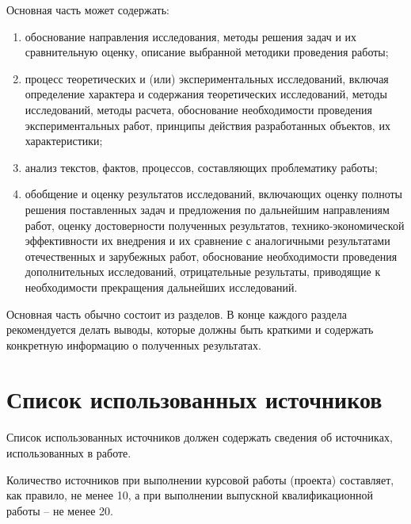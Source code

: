 \documentclass[14pt]{extreport}
\begin{document}
Основная часть может содержать:
\begin{enumerate}
\item обоснование направления исследования, методы решения задач и их сравнительную
оценку, описание выбранной методики проведения работы;
\item процесс теоретических и (или) экспериментальных исследований, включая
определение характера и содержания теоретических исследований, методы
исследований, методы расчета, обоснование необходимости проведения
экспериментальных работ, принципы действия разработанных объектов, их
характеристики;
\item\label{item4}  анализ текстов, фактов, процессов, составляющих проблематику работы;
\item обобщение и оценку результатов исследований, включающих оценку полноты
решения поставленных задач и предложения по дальнейшим направлениям работ,
оценку достоверности полученных результатов, технико-экономической
эффективности их внедрения и их сравнение с аналогичными результатами
отечественных и зарубежных работ, обоснование необходимости проведения
дополнительных исследований, отрицательные результаты, приводящие к
необходимости прекращения дальнейших исследований.
\end{enumerate}
Основная часть обычно состоит из разделов. В конце каждого раздела рекомендуется
делать выводы, которые должны быть краткими и содержать конкретную информацию о
полученных результатах.

\section{Список использованных источников}
Список использованных источников должен содержать сведения об источниках,
использованных в работе. 

Количество источников при выполнении курсовой работы (проекта) составляет, как
правило, не менее 10, а при выполнении выпускной квалификационной работы – не
менее 20.
\end{document}
